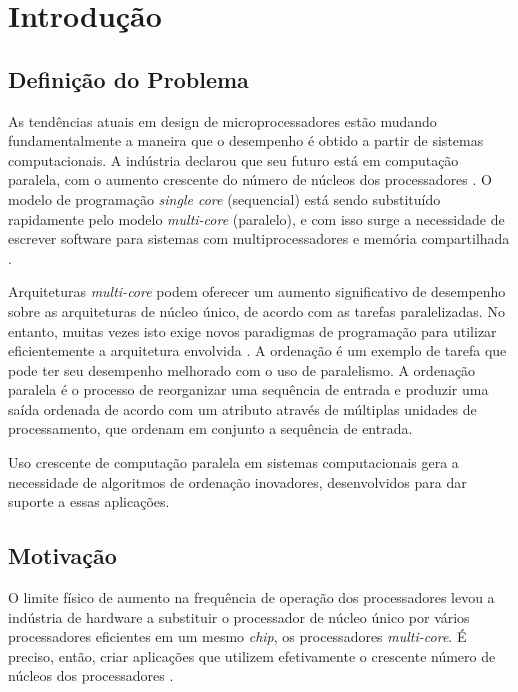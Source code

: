 \chapter{Introdução}

\section{Definição do Problema}

As tendências atuais em design de microprocessadores estão mudando fundamentalmente a maneira que o desempenho é obtido a partir de sistemas computacionais. 
A indústria declarou que seu futuro está em computação paralela, com o aumento crescente do número de núcleos dos processadores \cite{Asanovic:2009}.
O modelo de programação \textit{single core} (sequencial) está sendo substituído rapidamente pelo modelo \textit{multi-core} (paralelo), e com isso surge a necessidade de escrever software para sistemas com multiprocessadores e memória compartilhada \cite{Ernst:2009}.

Arquiteturas \textit{multi-core} podem oferecer um aumento significativo de desempenho sobre as arquiteturas de núcleo único, de acordo com as tarefas paralelizadas. No entanto, muitas vezes isto exige novos paradigmas de programação para utilizar eficientemente a arquitetura envolvida \cite{Prinslow:2011}. A ordenação
é um exemplo de tarefa que pode ter seu desempenho melhorado com o uso de paralelismo. 
A ordenação paralela é o processo de reorganizar uma sequência de entrada e produzir uma saída ordenada de acordo com um atributo através de múltiplas unidades de processamento, que ordenam em conjunto a sequência de entrada. 


Uso crescente de computação paralela em sistemas computacionais gera a necessidade de algoritmos de ordenação inovadores, desenvolvidos para dar suporte a essas aplicações. 

\section{Motivação}

O limite físico de aumento na frequência de operação dos processadores levou a indústria de hardware a substituir o processador de núcleo único por vários processadores eficientes em um mesmo \textit{chip}, os processadores \textit{multi-core}. 
É preciso, então, criar aplicações que utilizem efetivamente o crescente número de núcleos dos processadores  \cite{Asanovic:2009}.

